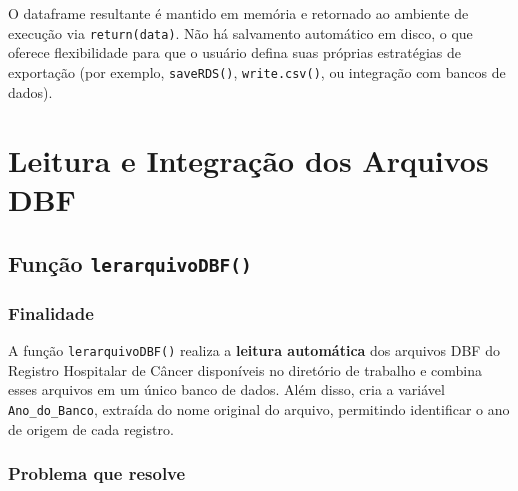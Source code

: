 \documentclass[
  brazilian,
  a4paper,
  oneside]{scrbook}
\begin{document}
\begin{tcolorbox}[enhanced jigsaw, arc=.35mm, bottomrule=.15mm, bottomtitle=1mm, breakable, colback=white, colbacktitle=quarto-callout-tip-color!10!white, colframe=quarto-callout-tip-color-frame, coltitle=black, left=2mm, leftrule=.75mm, opacityback=0, opacitybacktitle=0.6, rightrule=.15mm, title=\textcolor{quarto-callout-tip-color}{\faLightbulb}\hspace{0.5em}{Produto final}, titlerule=0mm, toprule=.15mm, toptitle=1mm]

O dataframe resultante é mantido em memória e retornado ao ambiente de
execução via \texttt{return(data)}. Não há salvamento automático em
disco, o que oferece flexibilidade para que o usuário defina suas
próprias estratégias de exportação (por exemplo, \texttt{saveRDS()},
\texttt{write.csv()}, ou integração com bancos de dados).

\end{tcolorbox}


\chapter{Leitura e Integração dos Arquivos
DBF}\label{leitura-e-integrauxe7uxe3o-dos-arquivos-dbf}

\section{\texorpdfstring{Função
\texttt{lerarquivoDBF()}}{Função lerarquivoDBF()}}\label{funuxe7uxe3o-lerarquivodbf}

\subsection{Finalidade}\label{finalidade}

A função \texttt{lerarquivoDBF()} realiza a \textbf{leitura automática}
dos arquivos DBF do Registro Hospitalar de Câncer disponíveis no
diretório de trabalho e combina esses arquivos em um único banco de
dados. Além disso, cria a variável \texttt{Ano\_do\_Banco}, extraída do
nome original do arquivo, permitindo identificar o ano de origem de cada
registro.

\subsection{Problema que resolve}\label{problema-que-resolve}
\end{document}
